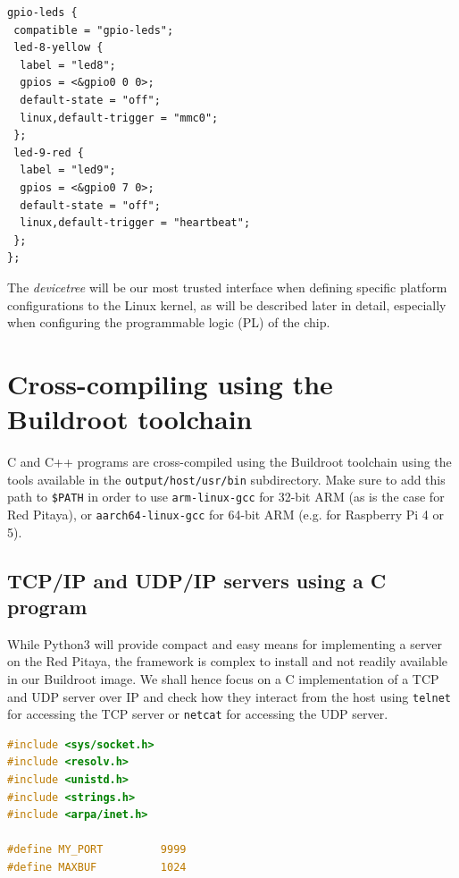 \documentclass{article}
\begin{document}
{{\footnotesize
\begin{verbatim}
gpio-leds {
 compatible = "gpio-leds";
 led-8-yellow {
  label = "led8";
  gpios = <&gpio0 0 0>;
  default-state = "off";
  linux,default-trigger = "mmc0";
 };
 led-9-red {
  label = "led9";
  gpios = <&gpio0 7 0>;
  default-state = "off";
  linux,default-trigger = "heartbeat";
 };
};
\end{verbatim}
}

The {\em devicetree} will be our most trusted interface when defining specific platform configurations
to the Linux kernel, as will be described later in detail, especially when configuring
the programmable logic (PL) of the chip.

\section{Cross-compiling using the Buildroot toolchain}

C and C++ programs are cross-compiled using the Buildroot toolchain using the tools available in the
{\tt output/host/usr/bin} subdirectory. Make sure to add this path to \verb~$PATH~ in order to use
{\tt arm-linux-gcc} for 32-bit ARM (as is the case for Red Pitaya), or {\tt aarch64-linux-gcc} for 64-bit
ARM (e.g. for Raspberry Pi 4 or 5).

\subsection{TCP/IP and UDP/IP servers using a C program}

While Python3 will provide compact and easy means for implementing a server on the Red Pitaya, the
framework is complex to install and not readily available in our Buildroot image. We shall hence focus
on a C implementation of a TCP and UDP server over IP and check how they interact from the host
using {\tt telnet} for accessing the TCP server or {\tt netcat} for accessing the UDP server.

\begin{lstlisting}[language=C,basicstyle=\footnotesize\ttfamily]
#include <sys/socket.h>
#include <resolv.h>
#include <unistd.h>
#include <strings.h>
#include <arpa/inet.h>

#define MY_PORT         9999
#define MAXBUF          1024


\end{lstlisting}}
\end{document}
